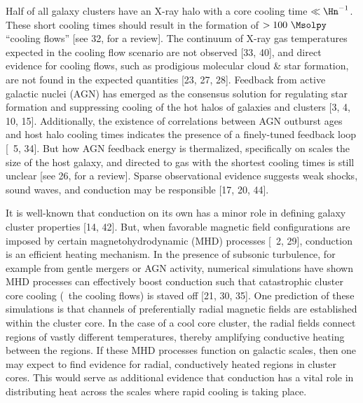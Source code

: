 \documentclass[11pt]{article}
\begin{document}
\justification

\cite{accept}

Half of all galaxy clusters have an X-ray halo with a core cooling
time $\ll \Hn^{-1}$. These short cooling times should result in the
formation of $> 100 ~\Msolpy$ ``cooling flows'' [see 32, for a
  review]. The continuum of X-ray gas temperatures expected in the
cooling flow scenario are not observed [33, 40], and direct evidence
for cooling flows, such as prodigious molecular cloud \& star
formation, are not found in the expected quantities [23, 27, 28].
Feedback from active galactic nuclei (AGN) has emerged as the
consensus solution for regulating star formation and suppressing
cooling of the hot halos of galaxies and clusters [3, 4, 10, 15].
Additionally, the existence of correlations between AGN outburst ages
and host halo cooling times indicates the presence of a finely-tuned
feedback loop [\ie\ 5, 34]. But how AGN feedback energy is
thermalized, specifically on scales the size of the host galaxy, and
directed to gas with the shortest cooling times is still unclear [see
  26, for a review]. Sparse observational evidence suggests weak
shocks, sound waves, and conduction may be responsible [17, 20, 44].

It is well-known that conduction on its own has a minor role in
defining galaxy cluster properties [14, 42]. But, when favorable
magnetic field configurations are imposed by certain
magnetohydrodynamic (MHD) processes [\eg\ 2, 29], conduction is an
efficient heating mechanism. In the presence of subsonic turbulence,
for example from gentle mergers or AGN activity, numerical simulations
have shown MHD processes can effectively boost conduction such that
catastrophic cluster core cooling (\ie\ the cooling flows) is staved
off [21, 30, 35]. One prediction of these simulations is that channels
of preferentially radial magnetic fields are established within the
cluster core. In the case of a cool core cluster, the radial fields
connect regions of vastly different temperatures, thereby amplifying
conductive heating between the regions. If these MHD processes
function on galactic scales, then one may expect to find evidence for
radial, conductively heated regions in cluster cores. This would serve
as additional evidence that conduction has a vital role in
distributing heat across the scales where rapid cooling is taking
place.
\end{document}
